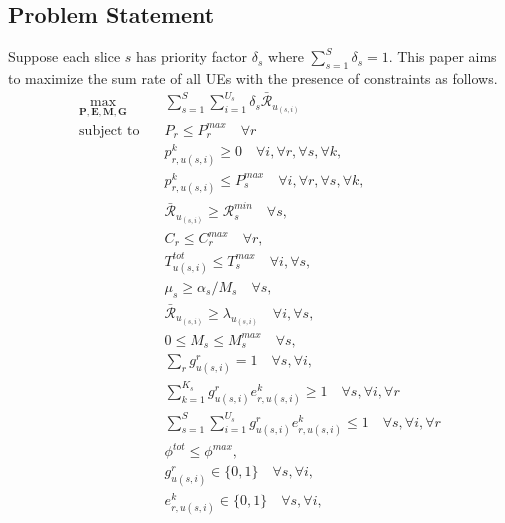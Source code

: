 \documentclass[conference]{IEEEtran}
\begin{document}
\subsection{Problem Statement}
Suppose each slice $s$ has priority factor $\delta_s$ where $\sum_{s=1}^S \delta_s =1$.
This paper aims to maximize the sum rate of all UEs with the presence of constraints as follows.
\begin{subequations}\label{problem}
\begin{alignat}{4}
\max\limits_{\boldsymbol{P}, \boldsymbol{E}, \boldsymbol{M}, \boldsymbol{G} }   \quad &  \sum_{s=1}^{S}\sum_{i=1}^{U_s}\delta_s \bar{\mathcal{R}}_{u_{(s,i)}} \ \\
\text{subject to} \quad  &  P_r \leq P^{max}_{r} \quad \forall r
 \label{c11} \\
&p_{r,u(s,i)}^{k}  \geq 0  \quad \forall i,\forall r,\forall s, \forall k,\label{c12} \\
&p_{r,u(s,i)}^{k}  \leq P_{s}^{max}  \quad \forall i,\forall r,\forall s, \forall k,\label{c12-1} \\
&\bar{\mathcal{R}}_{u_{(s,i)}} \geq \mathcal{R}_{{s}}^{min} \quad \forall s, \label{c13} \\
& C_r \leq C^{max}_r \quad \forall r, \label{c15}\\ 
&T^{tot}_{u(s,i)}  \leq T^{max}_{s} \quad \forall i,\forall s,\label{c16} \\
& \mu_s \geq \alpha_s/M_s \quad \forall s,\label{c16-1} \\
& \bar{\mathcal{R}}_{u_{(s,i)}} \geq {\lambda}_{u_{(s,i)}} \quad \forall i,\forall s,\label{c16-2} \\
& 0 \leq M_s \leq M^{max}_s  \quad \forall s,\label{c16-3}\\
& \sum_{r}g^r_{u(s,i)} = 1  \quad \forall s,\forall i, \label{c17}  \\
& \sum_{k =1}^{K_s} g^r_{u(s,i)} e^{k}_{r,u(s,i)} \geq 1  \quad \forall s,\forall i ,\forall r \label{c18-1} \\
& \sum_{s =1}^{S}\sum_{i=1}^{U_s}g^r_{u(s,i)} e^{k}_{r,u(s,i)} \leq 1  \quad \forall s,\forall i ,\forall r \label{c18} \\
& \phi^{tot}  \leq \phi^{max}, \label{c19} \\
& g^r_{u(s,i)} \in \{0,1\} \quad \forall s,\forall i, \label{c20}  \\
& e^k_{r,u(s,i)} \in \{0,1\} \quad \forall s,\forall i, \label{c21}  
\end{alignat}
\label{constraints}
\end{subequations}
\end{document}
